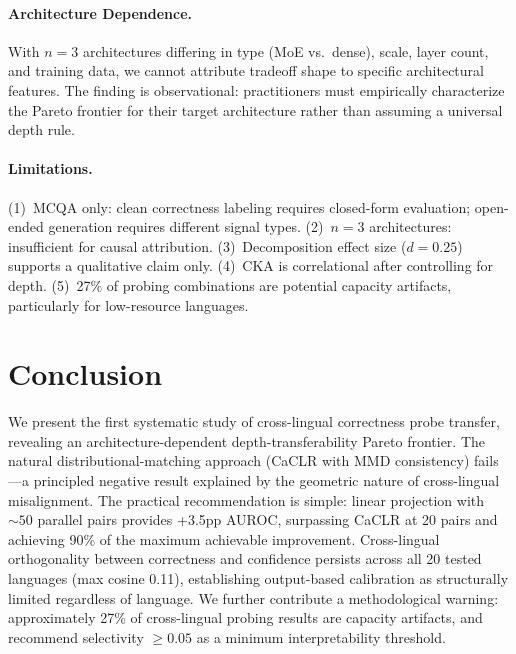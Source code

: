 \documentclass[11pt,a4paper]{article}
\begin{document}
\paragraph{Architecture Dependence.}
With $n = 3$ architectures differing in type (MoE vs.\ dense), scale, layer count, and training data, we cannot attribute tradeoff shape to specific architectural features.
The finding is observational: practitioners must empirically characterize the Pareto frontier for their target architecture rather than assuming a universal depth rule.

\paragraph{Limitations.}
(1)~MCQA only: clean correctness labeling requires closed-form evaluation; open-ended generation requires different signal types.
(2)~$n = 3$ architectures: insufficient for causal attribution.
(3)~Decomposition effect size ($d = 0.25$) supports a qualitative claim only.
(4)~CKA is correlational after controlling for depth.
(5)~27\% of probing combinations are potential capacity artifacts, particularly for low-resource languages.

\section{Conclusion}

We present the first systematic study of cross-lingual correctness probe transfer, revealing an architecture-dependent depth-transferability Pareto frontier.
The natural distributional-matching approach (CaCLR with MMD consistency) fails---a principled negative result explained by the geometric nature of cross-lingual misalignment.
The practical recommendation is simple: linear projection with ${\sim}50$ parallel pairs provides +3.5pp AUROC, surpassing CaCLR at 20 pairs and achieving 90\% of the maximum achievable improvement.
Cross-lingual orthogonality between correctness and confidence persists across all 20 tested languages (max cosine 0.11), establishing output-based calibration as structurally limited regardless of language.
We further contribute a methodological warning: approximately 27\% of cross-lingual probing results are capacity artifacts, and recommend selectivity $\geq 0.05$ as a minimum interpretability threshold.


\end{document}
